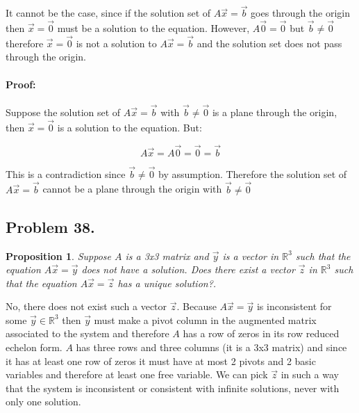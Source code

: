 \documentclass[12pt, letterpaper]{article}
\newcommand{\R}{\mathbb{R}}
\theoremstyle{statement}
\newtheorem*{atmProp}{Proposition}
\newenvironment{atmProof}{\noindent\ignorespaces\paragraph{Proof:}}{\hfill \ding{122}\par\noindent}
\begin{document}
                It cannot be the case, since if the solution set of $A\vec{x} = \vec{b}$ goes through the origin then $\vec{x} = \vec{0}$ must be a solution to the equation. However, $A\vec{0} = \vec{0}$ but $\vec{b} \neq \vec{0}$ therefore $\vec{x}= \vec{0}$ is not a solution to $A\vec{x} = \vec{b}$ and the solution set does not pass through the origin.
                
            \begin{atmProof}
                Suppose the solution set of $A\vec{x} = \vec{b}$ with $\vec{b} \neq \vec{0}$ is a plane through the origin, then $\vec{x} = \vec{0}$ is a solution to the equation. But:
                
                $$A\vec{x} = A\vec{0} = \vec{0} = \vec{b}$$
                
                This is a contradiction since $\vec{b} \neq \vec{0}$ by assumption. Therefore the solution set of $A\vec{x} = \vec{b}$ cannot be a plane through the origin with $\vec{b} \neq \vec{0}$
            \end{atmProof}
            
            \subsection*{Problem 38.}
            
            \begin{atmProp}
                Suppose $A$ is a 3x3 matrix and $\vec{y}$ is a vector in $\R^3$ such that the equation $A\vec{x} = \vec{y}$ does not have a solution. Does there exist a vector $\vec{z}$ in $\R^3$ such that the equation $A\vec{x}=\vec{z}$ has a unique solution?.
            \end{atmProp}
            
            No, there does not exist such a vector $\vec{z}$. Because $A\vec{x} = \vec{y}$ is inconsistent for some $\vec{y} \in \R^3$ then $\vec{y}$ must make a pivot column in the augmented matrix associated to the system and therefore $A$ has a row of zeros in its row reduced echelon form. $A$ has three rows and three columns (it is a 3x3 matrix) and since it has at least one row of zeros it must have at most 2 pivots and 2 basic variables and therefore at least one free variable. We can pick $\vec{z}$ in such a way that the system is inconsistent or consistent with infinite solutions, never with only one solution. 
            
\end{document}
